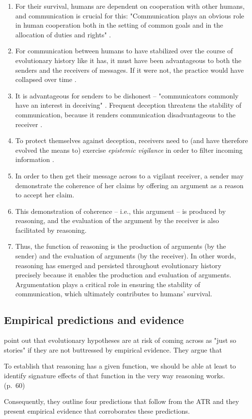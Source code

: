 \begin{enumerate}[label=(\arabic*)]
    \item For their survival, humans are dependent on cooperation with other humans, and communication is crucial for this: "Communication plays an obvious role in human cooperation both in the setting of common goals and in the allocation of duties and rights" \citep[p.~60]{MS11}.
    \item For communication between humans to have stabilized over the course of evolutionary history like it has, it must have been advantageous to both the senders and the receivers of messages. If it were not, the practice would have collapsed over time \citep{Sperber01}.
    \item It is advantageous for senders to be dishonest -- "communicators commonly have an interest in deceiving" \citep[p.~160]{MS09}. Frequent deception threatens the stability of communication, because it renders communication disadvantageous to the receiver \citep{Sperber01}.
    \item To protect themselves against deception, receivers need to (and have therefore evolved the means to) exercise \emph{epistemic vigilance} in order to filter incoming information \citep{Sperber10}.
    \item In order to then get their message across to a vigilant receiver, a sender may demonstrate the coherence of her claims by offering an argument as a reason to accept her claim.
    \item This demonstration of coherence -- i.e., this argument -- is produced by reasoning, and the evaluation of the argument by the receiver is also facilitated by reasoning.
    \item Thus, the function of reasoning is the production of arguments (by the sender) and the evaluation of arguments (by the receiver). In other words, reasoning has emerged and persisted throughout evolutionary history precisely because it enables the production and evaluation of arguments. Argumentation plays a critical role in ensuring the stability of communication, which ultimately contributes to humans' survival.
\end{enumerate}

\subsection{Empirical predictions and evidence}

\citet{MS11} point out that evolutionary hypotheses are at risk of coming across as "just so stories" if they are not buttressed by empirical evidence. They argue that
\begin{quoting}
    To establish that reasoning has a given function, we should be able at least to identify signature effects of that function in the very way reasoning works.
    \hfill (p.~60)
\end{quoting}
Consequently, they outline four predictions that follow from the ATR and they present empirical evidence that corroborates these predictions.

